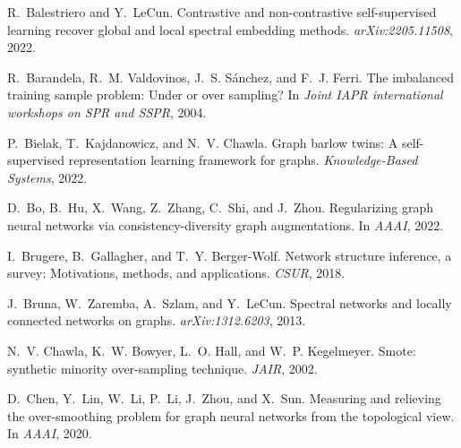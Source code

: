 \documentclass[11pt]{article}
\begin{document}
\begin{thebibliography}{10}
\itemsep=1.1pt
\begin{small}

R.~Balestriero and Y.~LeCun.
\newblock Contrastive and non-contrastive self-supervised learning recover
  global and local spectral embedding methods.
\newblock \emph{arXiv:2205.11508}, 2022.

R.~Barandela, R.~M. Valdovinos, J.~S. S{\'a}nchez, and F.~J. Ferri.
\newblock The imbalanced training sample problem: Under or over sampling?
\newblock In \emph{Joint IAPR international workshops on SPR and SSPR}, 2004.

P.~Bielak, T.~Kajdanowicz, and N.~V. Chawla.
\newblock Graph barlow twins: A self-supervised representation learning
  framework for graphs.
\newblock \emph{Knowledge-Based Systems}, 2022.

D.~Bo, B.~Hu, X.~Wang, Z.~Zhang, C.~Shi, and J.~Zhou.
\newblock Regularizing graph neural networks via consistency-diversity graph
  augmentations.
\newblock In \emph{AAAI}, 2022.

I.~Brugere, B.~Gallagher, and T.~Y. Berger-Wolf.
\newblock Network structure inference, a survey: Motivations, methods, and
  applications.
\newblock \emph{CSUR}, 2018.

J.~Bruna, W.~Zaremba, A.~Szlam, and Y.~LeCun.
\newblock Spectral networks and locally connected networks on graphs.
\newblock \emph{arXiv:1312.6203}, 2013.

N.~V. Chawla, K.~W. Bowyer, L.~O. Hall, and W.~P. Kegelmeyer.
\newblock Smote: synthetic minority over-sampling technique.
\newblock \emph{JAIR}, 2002.

D.~Chen, Y.~Lin, W.~Li, P.~Li, J.~Zhou, and X.~Sun.
\newblock Measuring and relieving the over-smoothing problem for graph neural
  networks from the topological view.
\newblock In \emph{AAAI}, 2020{}.


\end{small}
\end{thebibliography}
\end{document}
